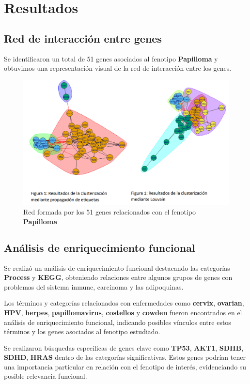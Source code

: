 
\section{Resultados}

\subsection{Red de interacción entre genes}

Se identificaron un total de 51 genes asociados al fenotipo \textbf{Papilloma} y obtuvimos una representación visual de la red de interacción entre los genes.
\begin{figure}
	\centering
	\includegraphics[width=0.8\linewidth]{figures/cluster_etiq_louvain}
	\caption{Red formada por los 51 genes relacionados con el fenotipo \textbf{Papilloma}}
	\label{fig:grado_centralidad}
\end{figure}

\subsection{Análisis de enriquecimiento funcional}

Se realizó un análisis de enriquecimiento funcional destacando las categorías \textbf{Process} y \textbf{KEGG}, obteniendo relaciones entre algunos grupos de genes con problemas del sistema inmune, carcinoma y las adipoquinas.

Los términos y categorías relacionados con enfermedades como \textbf{cervix}, \textbf{ovarian}, \textbf{HPV}, \textbf{herpes}, \textbf{papillomavirus}, \textbf{costellos} y \textbf{cowden} fueron encontrados en el análisis de enriquecimiento funcional, indicando posibles vínculos entre estos términos y los genes asociados al fenotipo estudiado.

Se realizaron búsquedas específicas de genes clave como \textbf{TP53}, \textbf{AKT1}, \textbf{SDHB}, \textbf{SDHD}, \textbf{HRAS} dentro de las categorías significativas. Estos genes podrían tener una importancia particular en relación con el fenotipo de interés, evidenciando su posible relevancia funcional.

